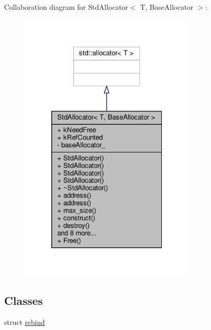 Collaboration diagram for Std\+Allocator$<$ T, Base\+Allocator $>$\+:
\nopagebreak
\begin{figure}[H]
\begin{center}
\leavevmode
\includegraphics[width=241pt]{classStdAllocator__coll__graph}
\end{center}
\end{figure}
\subsection*{Classes}
\begin{DoxyCompactItemize}
\item 
struct \hyperlink{structStdAllocator_1_1rebind}{rebind}
\end{DoxyCompactItemize}
